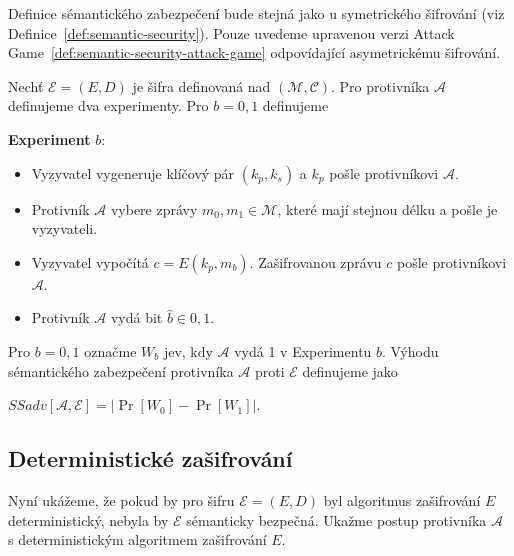 \documentclass[
  program=infoi,
  biblatex,
  figures=false,
  glossaries,
  index
]{kidiplom}
\begin{document}
        Definice sémantického zabezpečení bude stejná jako u symetrického šifrování (viz Definice~\ref{def:semantic-security}).
        Pouze uvedeme upravenou verzi Attack Game~\ref{def:semantic-security-attack-game} odpovídající asymetrickému šifrování.

        \begin{definition}
            
            Nechť $\mathcal{E} = (E, D)$ je šifra definovaná nad $(\mathcal{M},\mathcal{C})$.
            Pro protivníka $\mathcal{A}$ definujeme dva experimenty. Pro $b = 0, 1$ definujeme

            \medskip

            \textbf{Experiment} $b$:

            \begin{itemize}
                \item
                    Vyzyvatel vygeneruje klíčový pár $(k_p, k_s)$ a $k_p$ pošle protivníkovi $\mathcal{A}$.
                \item 
                    Protivník $\mathcal{A}$ vybere zprávy $m_0, m_1 \in \mathcal{M}$, které mají stejnou délku a pošle je vyzyvateli.
                \item
                    Vyzyvatel vypočítá $c = E(k_p, m_b)$.
                    Zašifrovanou zprávu $c$ pošle protivníkovi $\mathcal{A}$.
                \item
                    Protivník $\mathcal{A}$ vydá bit $\hat{b} \in {0,1}$.
            \end{itemize}

            Pro $b = 0, 1$ označme $W_b$ jev, kdy $\mathcal{A}$ vydá 1 v Experimentu $b$.
            Výhodu sémantického zabezpečení protivníka $\mathcal{A}$ proti $\mathcal{E}$ definujeme jako

            \begin{center}
                $SSadv[\mathcal{A}, \mathcal{E}] = \left\lvert\Pr[W_0] - \Pr[W_1]\right\rvert$.
            \end{center}

        \end{definition}


    \subsection{Deterministické zašifrování}
        
        Nyní ukážeme, že pokud by pro šifru $\mathcal{E} = (E, D)$ byl algoritmus zašifrování $E$ deterministický, nebyla by
        $\mathcal{E}$ sémanticky bezpečná.
        Ukažme postup protivníka $\mathcal{A}$ s deterministickým algoritmem zašifrování $E$.
\end{document}
